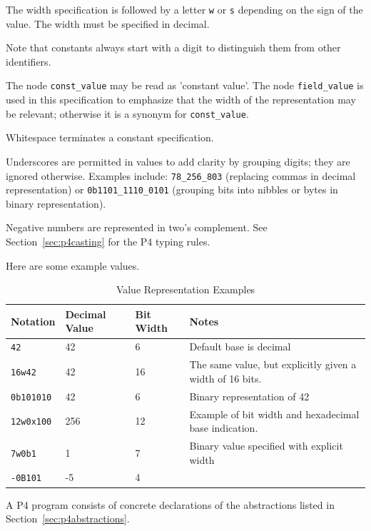 \documentclass[12pt]{article}
\begin{document}
The width specification is followed by a letter \texttt{w} or \texttt{s} 
depending on the sign of the value. The width must be specified in decimal.

Note that constants always start with a digit to distinguish them from other 
identifiers.

The node \texttt{const_value} may be read as 'constant value'. The node
\texttt{field_value} is used in this specification to emphasize that the width
of the representation may be relevant; otherwise it is a synonym for
\texttt{const_value}.

Whitespace terminates a constant specification.

Underscores are permitted in values to add clarity by grouping digits; they are
ignored otherwise. Examples include: \texttt{78_256_803} (replacing commas in
decimal representation) or \texttt{0b1101_1110_0101} (grouping bits into nibbles
or bytes in binary representation).

Negative numbers are represented in two's complement.  See
Section~\ref{sec:p4casting} for the P4 typing rules.

Here are some example values.

\begin{table}[H]
\begin{center}
\begin{tabular}{| l | l | l | p{} |} \hline
\textbf{Notation} &
\textbf{Decimal Value} & 
\textbf{Bit Width} &
\textbf{Notes} \\ \hline
\texttt{42} &
42 &
6 &
Default base is decimal \\ \hline
\texttt{16w42} &
42 &
16 &
The same value, but explicitly given a width of 16 bits. \\ \hline
\texttt{0b101010} &
42 &
6 &
Binary representation of 42  \\ \hline
\texttt{12w0x100} &
256 &
12 &
Example of bit width and hexadecimal base indication. \\ \hline
\texttt{7w0b1} &
1 &
7 &
Binary value specified with explicit width \\ \hline
\texttt{-0B101} &
-5 &
4 &
\\ \hline
\end{tabular}
\end{center}
\caption{Value Representation Examples}
\end{table}


A P4 program consists of concrete declarations of the abstractions listed in
Section~\ref{sec:p4abstractions}.
\end{document}

